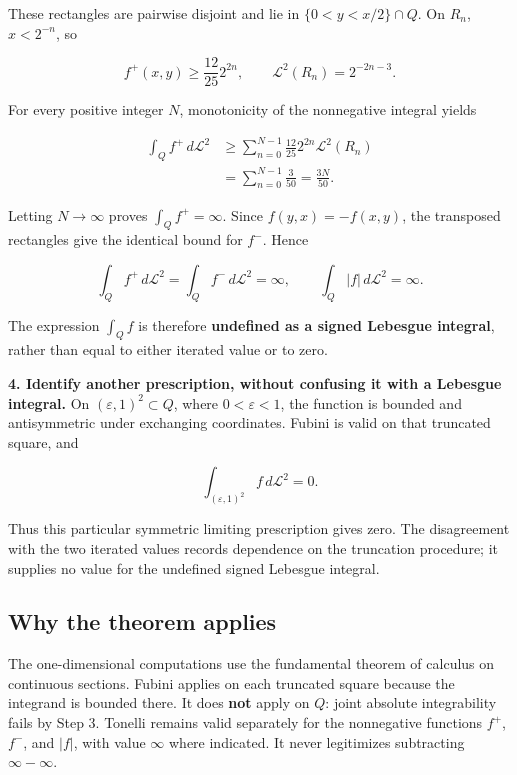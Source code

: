 \documentclass[
  11pt,
]{article}
\begin{document}
These rectangles are pairwise disjoint and lie in \(\{0<y<x/2\}\cap Q\).
On \(R_n\), \(x<2^{-n}\), so

\[
f^+(x,y)\geq\frac{12}{25}2^{2n},
\qquad \mathcal L^2(R_n)=2^{-2n-3}.
\]

For every positive integer \(N\), monotonicity of the nonnegative
integral yields

\[
\begin{aligned}
\int_Qf^+\,d\mathcal L^2
&\geq\sum_{n=0}^{N-1}
\frac{12}{25}2^{2n}\mathcal L^2(R_n)\\
&=\sum_{n=0}^{N-1}\frac3{50}
=\frac{3N}{50}.
\end{aligned}
\]

Letting \(N\to\infty\) proves \(\int_Qf^+=\infty\). Since
\(f(y,x)=-f(x,y)\), the transposed rectangles give the identical bound
for \(f^-\). Hence

\[
\int_Q f^+\,d\mathcal L^2
=\int_Q f^-\,d\mathcal L^2=\infty,
\qquad \int_Q|f|\,d\mathcal L^2=\infty.
\]

The expression \(\int_Qf\) is therefore \textbf{undefined as a signed
Lebesgue integral}, rather than equal to either iterated value or to
zero.

\textbf{4. Identify another prescription, without confusing it with a
Lebesgue integral.} On \((\varepsilon,1)^2\subset Q\), where
\(0<\varepsilon<1\), the function is bounded and antisymmetric under
exchanging coordinates. Fubini is valid on that truncated square, and

\[
\int_{(\varepsilon,1)^2}f\,d\mathcal L^2=0.
\]

Thus this particular symmetric limiting prescription gives zero. The
disagreement with the two iterated values records dependence on the
truncation procedure; it supplies no value for the undefined signed
Lebesgue integral.

\subsection{Why the theorem applies}\label{why-the-theorem-applies-3}

The one-dimensional computations use the fundamental theorem of calculus
on continuous sections. Fubini applies on each truncated square because
the integrand is bounded there. It does \textbf{not} apply on \(Q\):
joint absolute integrability fails by Step 3. Tonelli remains valid
separately for the nonnegative functions \(f^+\), \(f^-\), and \(|f|\),
with value \(\infty\) where indicated. It never legitimizes subtracting
\(\infty-\infty\).
\end{document}
